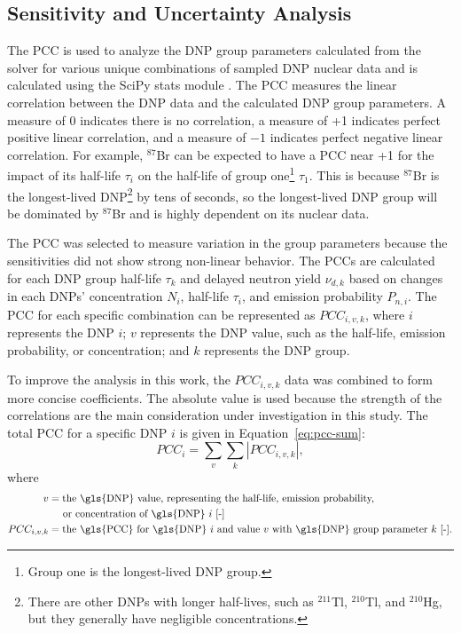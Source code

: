 \documentclass[hidelinks]{style/nseJournal}
\begin{document}
\subsection{Sensitivity and Uncertainty Analysis}

The \gls{PCC} is used to analyze the \gls{DNP} group parameters calculated from the solver for various unique combinations of sampled \gls{DNP} nuclear data and is calculated using the SciPy stats module \cite{scipy}.
The \gls{PCC} measures the linear correlation between the \gls{DNP} data and the calculated \gls{DNP} group parameters.
A measure of 0 indicates there is no correlation, a measure of +1 indicates perfect positive linear correlation, and a measure of $-1$ indicates perfect negative linear correlation.
For example, $^{87}$Br can be expected to have a \gls{PCC} near +1 for the impact of its half-life $\tau_i$ on the half-life of group one\footnote{Group one is the longest-lived \gls{DNP} group.} $\tau_1$.
This is because $^{87}$Br is the longest-lived \gls{DNP}\footnote{There are other \glspl{DNP} with longer half-lives, such as $^{211}$Tl, $^{210}$Tl, and $^{210}$Hg, but they generally have negligible concentrations.} by tens of seconds, so the longest-lived \gls{DNP} group will be dominated by $^{87}$Br and is highly dependent on its nuclear data.

The \gls{PCC} was selected to measure variation in the group parameters because the sensitivities did not show strong non-linear behavior.
The \glspl{PCC} are calculated for each \gls{DNP} group half-life $\tau_k$ and delayed neutron yield $\nu_{d,k}$ based on changes in each \glspl{DNP}' concentration $N_i$, half-life $\tau_i$, and emission probability $P_{n,i}$.
The \gls{PCC} for each specific combination can be represented as $PCC_{i,v,k}$, where $i$ represents the \gls{DNP} $i$; $v$ represents the \gls{DNP} value, such as the half-life, emission probability, or concentration; and $k$ represents the \gls{DNP} group.

To improve the analysis in this work, the $PCC_{i,v,k}$ data was combined to form more concise coefficients.
The absolute value is used because the strength of the correlations are the main consideration under investigation in this study.
The total \gls{PCC} for a specific \gls{DNP} $i$ is given in Equation~\eqref{eq:pcc-sum}:
\begin{equation}
    PCC_{i} = \sum_v \sum_k \left|PCC_{i,v,k}\right|,
    \label{eq:pcc-sum}
\end{equation}
where
\begin{align}
    v &= \text{the \gls{DNP} value, representing the half-life, emission probability,} \nonumber \\
    &\text{\;\;\;\;\;or concentration of \gls{DNP} $i$ [-]} \nonumber \\
    PCC_{i, v, k} &= \text{the \gls{PCC} for \gls{DNP} $i$ and value $v$ with \gls{DNP} group parameter $k$ [-].} \nonumber
\end{align}
\end{document}
